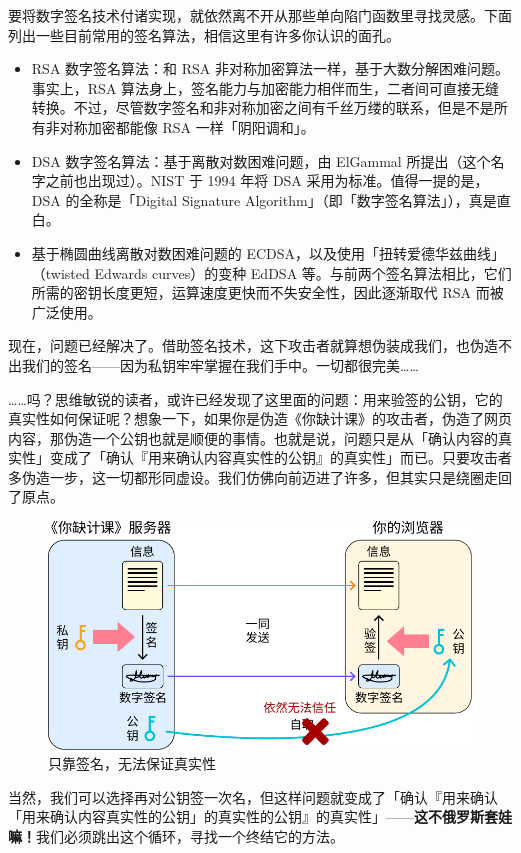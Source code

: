 要将数字签名技术付诸实现，就依然离不开从那些单向陷门函数里寻找灵感。下面列出一些目前常用的签名算法，相信这里有许多你认识的面孔。

\begin{itemize}
  \item RSA 数字签名算法：和 RSA 非对称加密算法一样，基于大数分解困难问题。事实上，RSA 算法身上，签名能力与加密能力相伴而生，二者间可直接无缝转换。不过，尽管数字签名和非对称加密之间有千丝万缕的联系，但是不是所有非对称加密都能像 RSA 一样「阴阳调和」。
  \item DSA 数字签名算法：基于离散对数困难问题，由 ElGammal 所提出（这个名字之前也出现过）。NIST 于 1994 年将 DSA 采用为标准。值得一提的是，DSA 的全称是「Digital Signature Algorithm」（即「数字签名算法」），真是直白。
  \item 基于椭圆曲线离散对数困难问题的 ECDSA，以及使用「扭转爱德华兹曲线」（twisted Edwards curves）的变种 EdDSA 等。与前两个签名算法相比，它们所需的密钥长度更短，运算速度更快而不失安全性，因此逐渐取代 RSA 而被广泛使用。
\end{itemize}

现在，问题已经解决了。借助签名技术，这下攻击者就算想伪装成我们，也伪造不出我们的签名——因为私钥牢牢掌握在我们手中。一切都很完美……

……吗？思维敏锐的读者，或许已经发现了这里面的问题：用来验签的公钥，它的真实性如何保证呢？想象一下，如果你是伪造《你缺计课》的攻击者，伪造了网页内容，那伪造一个公钥也就是顺便的事情。也就是说，问题只是从「确认内容的真实性」变成了「确认『用来确认内容真实性的公钥』的真实性」而已。只要攻击者多伪造一步，这一切都形同虚设。我们仿佛向前迈进了许多，但其实只是绕圈走回了原点。

\begin{figure}[htb!]
  \centering
  \includegraphics[width=.65\textwidth]{assets/surpass/Signing_invalid.pdf}
  \caption{只靠签名，无法保证真实性}
  \label{fig:Signing_invalid}
\end{figure}

\begin{note}
  当然，我们可以选择再对公钥签一次名，但这样问题就变成了「确认『用来确认「用来确认内容真实性的公钥」的真实性的公钥』的真实性」——\textbf{这不俄罗斯套娃嘛！}我们必须跳出这个循环，寻找一个终结它的方法。
\end{note}

